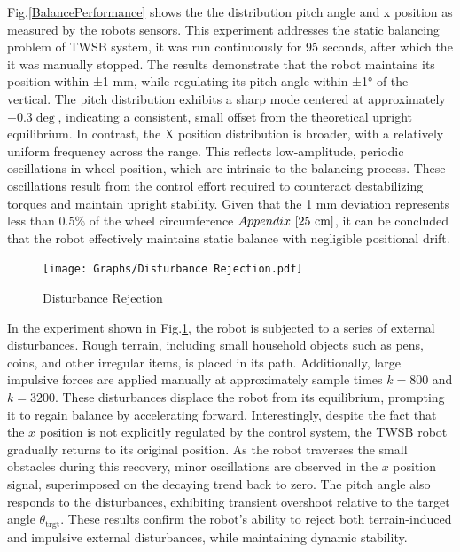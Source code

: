     Fig.\ref{BalancePerformance} shows the 
    the distribution pitch angle and x position as measured by the robots sensors. 
    This experiment addresses the static balancing problem of TWSB system, it was run continuously for 95 seconds,
    after which the it was manually stopped. The results demonstrate that the robot maintains its position within ±1 mm, 
    while regulating its pitch angle within ±1° of the vertical. The pitch distribution exhibits a sharp mode centered
    at approximately $-0.3\deg$, indicating a consistent, small offset from the theoretical upright equilibrium. 
    In contrast, the X position distribution is broader, with a relatively uniform frequency across the range. 
    This reflects low-amplitude, periodic oscillations in wheel position, which are intrinsic to the balancing process. 
    These oscillations result from the control effort required to counteract destabilizing torques and maintain upright stability. 
    Given that the 1 mm deviation represents less than $0.5\%$ of the wheel circumference $\appx{25 cm}$, 
    it can be concluded that the robot effectively maintains static balance with negligible positional drift.

    \begin{figure}[H]
        \centering
        \texttt{[image: Graphs/Disturbance Rejection.pdf]}
        \caption{Disturbance Rejection}
        \label{fig:DisturbanceRejection}
    \end{figure}

    In the experiment shown in Fig.\ref{fig:DisturbanceRejection}, the robot is subjected to a series of external disturbances. 
    Rough terrain, including small household objects such as pens, coins, and other irregular items, is placed in its path. 
    Additionally, large impulsive forces are applied manually at approximately sample times $k = 800$ and $k = 3200$. 
    These disturbances displace the robot from its equilibrium, prompting it to regain balance by accelerating forward.
    Interestingly, despite the fact that the $x$ position is not explicitly regulated by the control system, 
    the TWSB robot gradually returns to its original position. As the robot traverses the small obstacles during this recovery, 
    minor oscillations are observed in the $x$ position signal, superimposed on the decaying trend back to zero.
    The pitch angle also responds to the disturbances, exhibiting transient overshoot relative to the 
    target angle  $\theta_{\text{trgt}}$. These results confirm the robot's ability to reject both terrain-induced 
    and impulsive external disturbances, while maintaining dynamic stability.

